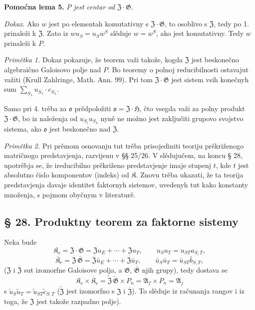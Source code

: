 \documentclass[11pt]{article}
\begin{document}
\noindent\textbf{Pomoćna lema 5.} \emph{\(P\) jest centar od \(\mathfrak Z\cdot\mathfrak G\).}

\noindent\emph{Dokaz.} Ako \(w\) jest po elementah komutativny s \(\mathfrak Z\cdot\mathfrak G\), to osoblivo s \(\mathfrak Z\), tedy po 1. prinaleži k \(\mathfrak Z\). Zato iz \(wu_S=u_Sw^S\) slěduje \(w=w^S\), ako jest komutativny. Tedy \(w\) prinaleži k \(P\).

\noindent\emph{Primětka 1.} Dokaz pokazuje, že teorem važi takože, kogda \(\mathfrak Z\) jest beskonečno algebraično Galoisovo polje nad \(P\). Bo teoremy o polnoj reducibilnosti ostavajut važiti (Krull Zahlringe, Math. Ann. 99). Pri tom \(\mathfrak Z\cdot\mathfrak G\) jest sistem vsih konečnyh sum \(\sum_{S_\lambda}u_{S_\lambda}\cdot c_{S_\lambda}\).

Samo pri 4. trěba za \(\mathfrak o\) prědpoložiti \(\mathfrak o=\mathfrak Z\cdot\mathfrak H\), čto vsegda važi za polny produkt \(\mathfrak Z\cdot\mathfrak G\), bo iz naleženja od \(u_{S_i}u_{S_k}\) nyně ne možno jest zaključiti grupovo svojstvo sistema, ako \(\mathfrak o\) jest beskonečno nad \(\mathfrak Z\).

\noindent\emph{Primětka 2.} Pri prěmom osnovanju tut trěba prisojediniti teoriju prěkriženogo matričnogo predstavjenja, razvijenu v §§ 25/26. V slědujučem, na koncu § 28, upotrěbja se, že ireducibilno prěkriženo predstavjenje imaje stupenj \(t\), kde \(t\) jest absolutno čislo komponentov (indeks) od \(\mathfrak K\). Znovu trěba ukazati, že ta teorija predstavjenja davaje identitet faktornyh sistemov, uvedenyh tut kako konstanty množenja, s pojmom obyčnym v literaturě.

\subsection*{§ 28. Produktny teorem za faktorne sistemy}\label{produktsatz-fuer-faktorensysteme}

Neka bude
\[
\mathfrak K_r=\mathfrak Z\cdot\mathfrak G
=\mathfrak Zu_E+\cdots+\mathfrak Zu_T,
\qquad u_Su_T=u_{ST}a_{S,T},
\]
\[
\overline{\mathfrak K}_r
=\overline{\mathfrak Z}\,\overline{\mathfrak G}
=\overline{\mathfrak Z}\bar u_E+\cdots+\overline{\mathfrak Z}\bar u_T,
\qquad
\bar u_S\bar u_T=\bar u_{ST}\bar b_{S,T},
\]
(\(\mathfrak Z\) i \(\overline{\mathfrak Z}\) sut izomorfne Galoisove polja, a \(\mathfrak G\), \(\overline{\mathfrak G}\) njih grupy), tedy dostava se
\[
\mathfrak K_r\times\overline{\mathfrak K}_r
=\widetilde{\mathfrak Z}\,\widetilde{\mathfrak G}\times P_n
=\mathfrak A_f\times P_n
=\mathfrak A_j
\]
s \(\tilde u_S\tilde u_T=\tilde u_{ST}\tilde c_{S,T}\) (\(\widetilde{\mathfrak Z}\) jest izomorfno s \(\mathfrak Z\) i \(\overline{\mathfrak Z}\)). To slěduje iz računanja rangov i iz toga, že \(\mathfrak Z\) jest takože razpadno polje).
\end{document}
